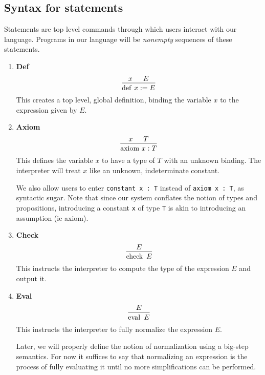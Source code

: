 \documentclass{article}
\begin{document}
\subsection{Syntax for statements}
Statements are top level commands through which users interact with our
language. Programs in our language will be \textit{nonempty} sequences of
these statements.

\begin{enumerate}
\item \textbf{Def} \\
\[
  \begin{prooftree}
    \hypo{x}
    \hypo{E}
    \infer2{\deff \, x := E}
  \end{prooftree}
\]
This creates a top level, global definition, binding the variable $x$ to the
expression given by $E$.

\item \textbf{Axiom} \\
\[
  \begin{prooftree}
    \hypo{x}
    \hypo{T}
    \infer2{\axiom \, x : T}
  \end{prooftree}
\]
This defines the variable $x$ to have a type of $T$ with an unknown binding.
The interpreter will treat $x$ like an unknown, indeterminate constant.

We also allow users to enter \verb|constant x : T| instead of \verb|axiom x : T|,
as syntactic sugar. Note that since our system conflates the notion of types and
propositions, introducing a constant \verb|x| of type \verb|T| is akin to
introducing an assumption (ie axiom).

\item \textbf{Check} \\
\[
  \begin{prooftree}
    \hypo{E}
    \infer1{\checkk \,\, E}
  \end{prooftree}
\]
This instructs the interpreter to compute the type of the expression $E$ and
output it.

\item \textbf{Eval} \\
\[
  \begin{prooftree}
    \hypo{E}
    \infer1{\evall \,\, E}
  \end{prooftree}
\]
This instructs the interpreter to fully normalize the expression $E$.

Later, we will properly define the notion of normalization using a
big-step semantics. For now it suffices to say that normalizing an expression
is the process of fully evaluating it until no more simplifications can be
performed.

\end{enumerate}
\end{document}
